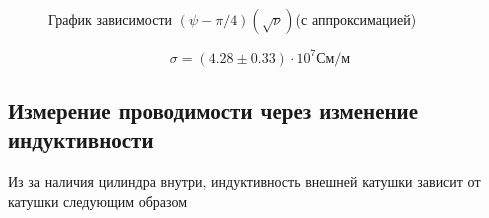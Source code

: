 \documentclass[a4paper, 12pt]{article}
\begin{document}
\begin{figure}[h]
    \caption{График зависимости $(\psi - \pi/4)(\sqrt{\nu})$(с аппроксимацией)}\label{fig:psi_sqrt_nu}
    \newpage
\end{figure}
\begin{equation}
    \sigma = (4.28 \pm 0.33) \cdot 10^7 \text{См/м}
\end{equation}
\newpage
\newpage
\subsection{Измерение проводимости через изменение индуктивности}

Из за наличия цилиндра внутри, индуктивность внешней катушки зависит от катушки
следующим образом
\end{document}
